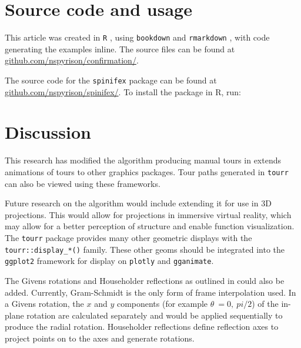 \documentclass{monashthesis}
\begin{document}
\section{Source code and usage}\label{source-code-and-usage}

This article was created in \texttt{R} \autocite{r_core_team_r:_2018},
using \texttt{bookdown} \autocite{xie_bookdown:_2016} and
\texttt{rmarkdown} \autocite{xie_r_2018}, with code generating the
examples inline. The source files can be found at
\href{https://github.com/nspyrison/confirmation/}{github.com/nspyrison/confirmation/}.

The source code for the \texttt{spinifex} package can be found at
\href{https://github.com/nspyrison/spinifex/}{github.com/nspyrison/spinifex/}.
To install the package in R, run:

\begin{Shaded}
\begin{Highlighting}[]
\OperatorTok{::}\NormalTok{(}\NormalTok{)}
\end{Highlighting}
\end{Shaded}

\section{Discussion}\label{sec:discussion}

This research has modified the algorithm producing manual tours in
extends animations of tours to other graphics packages. Tour paths
generated in \texttt{tourr} can also be viewed using these frameworks.

Future research on the algorithm would include extending it for use in
3D projections. This would allow for projections in immersive virtual
reality, which may allow for a better perception of structure and enable
function visualization. The \texttt{tourr} package provides many other
geometric displays with the \texttt{tourr::display\_*()} family. These
other geoms should be integrated into the \texttt{ggplot2} framework for
display on \texttt{plotly} and \texttt{gganimate}.

The Givens rotations and Householder reflections as outlined in
\textcite{buja_computational_2005} could also be added. Currently,
Gram-Schmidt is the only form of frame interpolation used. In a Givens
rotation, the \(x\) and \(y\) components (for example
\(\theta~= 0,~pi/2\)) of the in-plane rotation are calculated separately
and would be applied sequentially to produce the radial rotation.
Householder reflections define reflection axes to project points on to
the axes and generate rotations.
\end{document}
